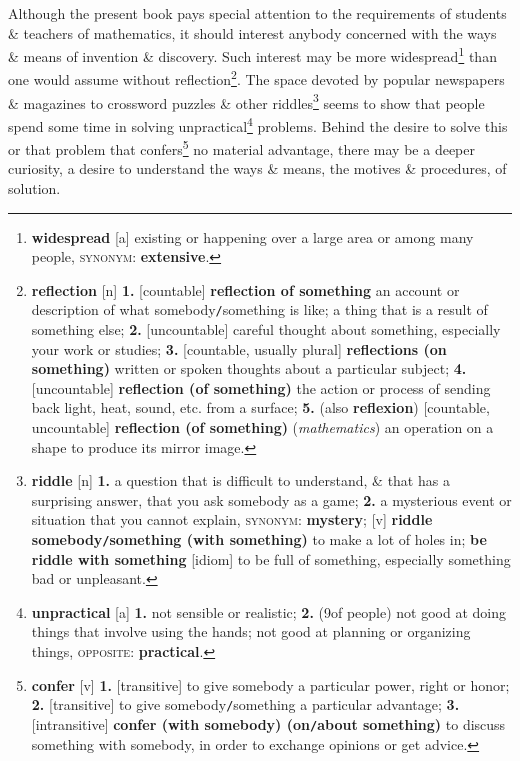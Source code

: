 \documentclass[oneside]{book}
\numberwithin{equation}{section}
\begin{document}
Although the present book pays special attention to the requirements of students \& teachers of mathematics, it should interest anybody concerned with the ways \& means of invention \& discovery. Such interest may be more widespread\footnote{\textbf{widespread} [a] existing or happening over a large area or among many people, \textsc{synonym}: \textbf{extensive}.} than one would assume without reflection\footnote{\textbf{reflection} [n] \textbf{1.} [countable] \textbf{reflection of something} an account or description of what somebody\texttt{/}something is like; a thing that is a result of something else; \textbf{2.} [uncountable] careful thought about something, especially your work or studies; \textbf{3.} [countable, usually plural] \textbf{reflections (on something)} written or spoken thoughts about a particular subject; \textbf{4.} [uncountable] \textbf{reflection (of something)} the action or process of sending back light, heat, sound, etc. from a surface; \textbf{5.} (also \textbf{reflexion}) [countable, uncountable] \textbf{reflection (of something)} (\textit{mathematics}) an operation on a shape to produce its mirror image.}. The space devoted by popular newspapers \& magazines to crossword puzzles \& other riddles\footnote{\textbf{riddle} [n] \textbf{1.} a question that is difficult to understand, \& that has a surprising answer, that you ask somebody as a game; \textbf{2.} a mysterious event or situation that you cannot explain, \textsc{synonym}: \textbf{mystery}; [v] \textbf{riddle somebody\texttt{/}something (with something)} to make a lot of holes in; \textbf{be riddle with something} [idiom] to be full of something, especially something bad or unpleasant.} seems to show that people spend some time in solving unpractical\footnote{\textbf{unpractical} [a] \textbf{1.} not sensible or realistic; \textbf{2.} (9of people) not good at doing things that involve using the hands; not good at planning or organizing things, \textsc{opposite}: \textbf{practical}.} problems. Behind the desire to solve this or that problem that confers\footnote{\textbf{confer} [v] \textbf{1.} [transitive] to give somebody a particular power, right or honor; \textbf{2.} [transitive] to give somebody\texttt{/}something a particular advantage; \textbf{3.} [intransitive] \textbf{confer (with somebody) (on\texttt{/}about something)} to discuss something with somebody, in order to exchange opinions or get advice.} no material advantage, there may be a deeper curiosity, a desire to understand the ways \& means, the motives \& procedures, of solution.
\end{document}

